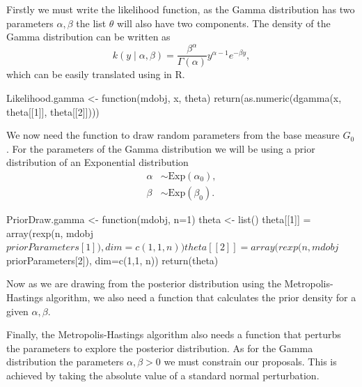 \documentclass[nojss]{jss}
\begin{document}
Firstly we must write the likelihood function, as the Gamma distribution has two parameters $\alpha, \beta$ the list $\theta$ will also have two components. The density of the Gamma distribution can be written as
\begin{equation*}
k(y \mid \alpha, \beta) = \frac{\beta ^ \alpha}{\Gamma (\alpha)} y^{\alpha -1} e ^{- \beta y},
\end{equation*}
which can be easily translated using  in R.
\begin{CodeInput}
Likelihood.gamma <- function(mdobj, x, theta){
  return(as.numeric(dgamma(x, theta[[1]], theta[[2]])))
}
\end{CodeInput}

We now need the function to draw random parameters from the base measure $G_0$. For the parameters of the Gamma distribution we will be using a prior distribution of an Exponential distribution
\begin{align*}
\alpha & \sim \text{Exp} (\alpha _0), \\
\beta & \sim \text{Exp} (\beta _0).
\end{align*}

\begin{CodeInput}
PriorDraw.gamma <- function(mdobj, n=1){
  theta <- list()
  theta[[1]] = array(rexp(n, mdobj$priorParameters[1]), dim=c(1,1, n))
  theta[[2]] = array(rexp(n, mdobj$priorParameters[2]), dim=c(1,1, n))
  return(theta)
}
\end{CodeInput}

Now as we are drawing from the posterior distribution using the Metropolis-Hastings algorithm, we also need a function that calculates the prior density for a given ${\alpha, \beta}$.

Finally, the Metropolis-Hastings algorithm also needs a function that perturbs the parameters to explore the posterior distribution. As for the Gamma distribution the parameters $\alpha, \beta >0$ we must constrain our proposals. This is achieved by taking the absolute value of a standard normal perturbation.
\end{document}
